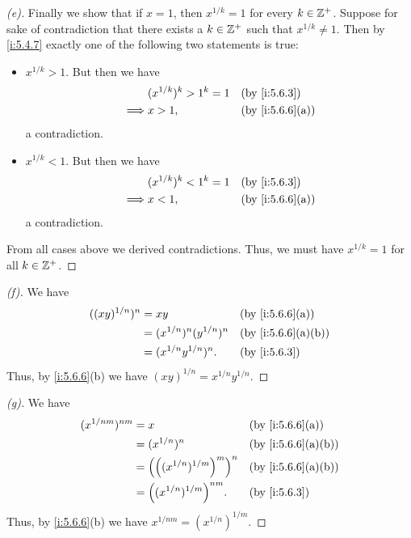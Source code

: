 \begin{proof}[(e)]
  Finally we show that if \(x = 1\), then \(x^{1 / k} = 1\) for every \(k \in \mathbb{Z}^+\).
  Suppose for sake of contradiction that there exists a \(k \in \mathbb{Z}^+\) such that \(x^{1 / k} \neq 1\).
  Then by \cref{i:5.4.7} exactly one of the following two statements is true:
  \begin{itemize}
    \item \(x^{1 / k} > 1\).
          But then we have
          \begin{align*}
                     & (x^{1 / k})^k > 1^k = 1 &  & \by{i:5.6.3}    \\
            \implies & x > 1,                  &  & \by{i:5.6.6}[a]
          \end{align*}
          a contradiction.
    \item \(x^{1 / k} < 1\).
          But then we have
          \begin{align*}
                     & (x^{1 / k})^k < 1^k = 1 &  & \by{i:5.6.3}    \\
            \implies & x < 1,                  &  & \by{i:5.6.6}[a]
          \end{align*}
          a contradiction.
  \end{itemize}
  From all cases above we derived contradictions.
  Thus, we must have \(x^{1 / k} = 1\) for all \(k \in \mathbb{Z}^+\).
\end{proof}

\begin{proof}[(f)]
  We have
  \begin{align*}
    ((xy)^{1 / n})^n & = xy                          &  & \by{i:5.6.6}[a]   \\
                     & = (x^{1 / n})^n (y^{1 / n})^n &  & \by{i:5.6.6}[a,b] \\
                     & = (x^{1 / n} y^{1 / n})^n.    &  & \by{i:5.6.3}
  \end{align*}
  Thus, by \cref{i:5.6.6}(b) we have \((xy)^{1 / n} = x^{1 / n} y^{1 / n}\).
\end{proof}

\begin{proof}[(g)]
  We have
  \begin{align*}
    (x^{1 / nm})^{nm} & = x                                 &  & \by{i:5.6.6}[a]   \\
                      & = (x^{1 / n})^n                     &  & \by{i:5.6.6}[a,b] \\
                      & = \pa{\pa{(x^{1 / n})^{1 / m}}^m}^n &  & \by{i:5.6.6}[a,b] \\
                      & = \pa{(x^{1 / n})^{1 / m}}^{nm}.    &  & \by{i:5.6.3}
  \end{align*}
  Thus, by \cref{i:5.6.6}(b) we have \(x^{1 / nm} = (x^{1 / n})^{1 / m}\).
\end{proof}

